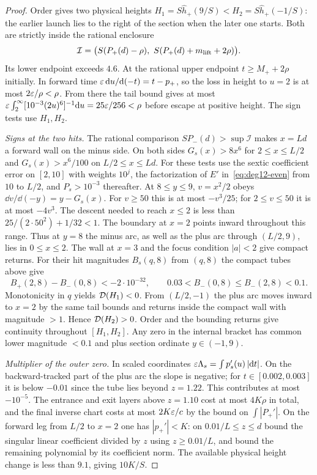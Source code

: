 \begin{proof}
Order gives two physical heights
$H_1=S\widehat h_+(9/S)<H_2=S\widehat h_+(-1/S)$: the earlier
launch lies to the right of the section when the later one starts.
Both are strictly inside the rational enclosure
\[
 \mathcal I=\big(S(P_+(d)-\rho),\ S(P_+(d)+m_{\rm lift}+2\rho)\big).
\]
Its lower endpoint exceeds $4.6$. At the rational upper endpoint
$t\ge M_++2\rho$ initially. In forward time $\varepsilon\,\mathrm{d} u/\mathrm{d}(-t)=t-p_+$,
so the loss in height to $u=2$ is at most $2\varepsilon/\rho<\rho$.
From there the tail bound gives at most
$\varepsilon\int_2^\infty[10^{-3}(2u)^6]^{-1}\mathrm{d} u=25\varepsilon/256<\rho$
before escape at positive height. The sign tests use $H_1,H_2$.

\emph{Signs at the two hits.}
The rational comparison $SP_-(d)>\sup\mathcal I$ makes $x=Ld$ a
forward wall on the minus side. On both sides $G_s(x)>8x^6$ for
$2\le x\le L/2$ and $G_s(x)>x^6/100$ on $L/2\le x\le Ld$.
For these tests use the sextic coefficient error on $[2,10]$ with
weights $10^j$, the factorization of $E'$ in~\eqref{eq:deg12-even}
from $10$ to $L/2$, and $P_s>10^{-3}$ thereafter.
At $8\le y\le9$, $v=x^2/2$ obeys $\dd v/\dd(-y)=y-G_s(x)$.
For $v\ge50$ this is at most $-v^3/25$; for $2\le v\le50$ it is
at most $-4v^3$. The descent needed to reach $x\le2$ is less than
$25/(2\cdot50^2)+1/32<1$. The boundary at $x=2$ points inward
throughout this range. Thus at $y=8$ the minus arc, as well as the
plus arc through $(L/2,9)$, lies in $0\le x\le2$. The wall at $x=3$
and the focus condition $|a|<2$ give compact returns. For their hit
magnitudes $B_s(q,8)$ from $(q,8)$ the compact tubes above give
\[
 B_+(2,8)-B_-(0,8)<-2\cdot10^{-32},\qquad
 0.03<B_-(0,8)\le B_-(2,8)<0.1.
\]
Monotonicity in $q$ yields $\mathcal{D}(H_1)<0$. From $(L/2,-1)$ the plus
arc moves inward to $x=2$ by the same tail bounds and returns inside
the compact wall with magnitude $>1$. Hence $\mathcal{D}(H_2)>0$. Order
and the bounding returns give continuity throughout $[H_1,H_2]$.
Any zero in the internal bracket has common lower magnitude $<0.1$
and plus section ordinate $y\in(-1,9)$.

\emph{Multiplier of the outer zero.}
In scaled coordinates $\varepsilon \Lambda_s=\int p_s'(u)\,|\mathrm{d} t|$.
On the backward-tracked part of the plus arc the slope is negative;
for $t\in[0.002,0.003]$ it is below $-0.01$ since the tube lies
beyond $z=1.22$. This contributes at most $-10^{-5}$. The entrance
and exit layers above $z=1.10$ cost at most $4K\rho$ in total, and
the final inverse chart costs at most $2K\varepsilon/c$ by the bound
on $\int |P_+'|$. On the forward leg from $L/2$ to $x=2$ one has
$|p_+'|<K$: on $0.01/L\le z\le d$ bound the singular linear
coefficient divided by $z$ using $z\ge0.01/L$, and bound the
remaining polynomial by its coefficient norm. The available physical
height change is less than $9.1$, giving $10K/S$.


\end{proof}
